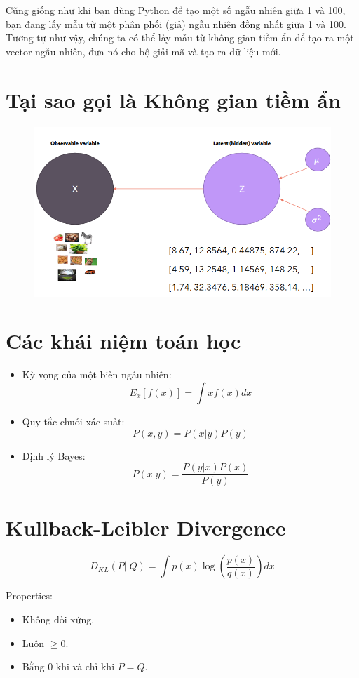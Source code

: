 \documentclass{book}
\begin{document}
Cũng giống như khi bạn dùng Python để tạo một số ngẫu nhiên giữa 1 và 100, bạn đang lấy mẫu từ một phân phối (giả) ngẫu nhiên đồng nhất giữa 1 và 100. Tương tự như vậy, chúng ta có thể lấy mẫu từ không gian tiềm ẩn để tạo ra một vector ngẫu nhiên, đưa nó cho bộ giải mã và tạo ra dữ liệu mới.


\section{Tại sao gọi là Không gian tiềm ẩn}
\begin{figure}[H]
    \centering
    \includegraphics[width=0.75\linewidth]{images/VAE_7.png}
\end{figure}

\section{Các khái niệm toán học}

\begin{itemize}
    \item Kỳ vọng của một biến ngẫu nhiên:
    $$ E_x[f(x)] = \int x f(x) dx $$
    \item Quy tắc chuỗi xác suất:
    $$ P(x,y) = P(x|y)P(y) $$
    \item Định lý Bayes:
    $$ P(x | y) = \frac{P(y|x)P(x)}{P(y)} $$
\end{itemize}

\section{Kullback-Leibler Divergence}
$$ D_{KL}(P||Q) = \int p(x) \log \left(\frac{p(x)}{q(x)}\right) dx $$

Properties:
\begin{itemize}
    \item Không đối xứng.
    \item Luôn $\ge 0$.
    \item Bằng 0 khi và chỉ khi $P = Q$.
\end{itemize}
\end{document}

